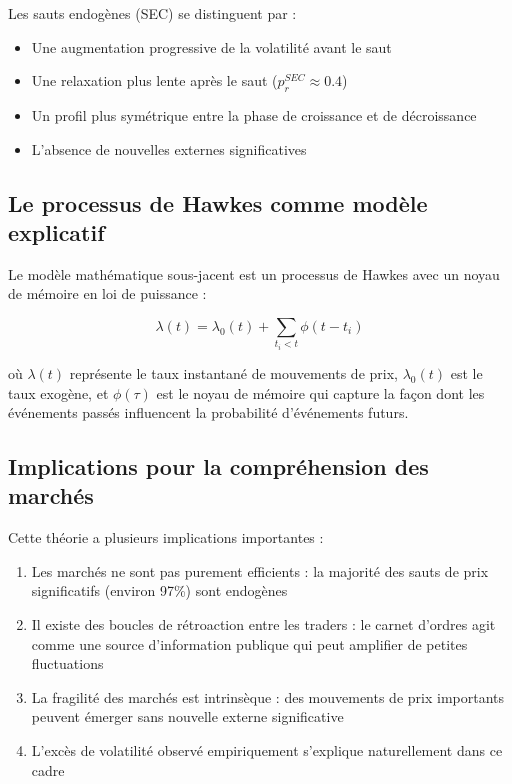 \documentclass[12pt,a4paper]{article}
\theoremstyle{definition}
\theoremstyle{remark}
\begin{document}
Les sauts endogènes (SEC) se distinguent par :
\begin{itemize}
    \item Une augmentation progressive de la volatilité avant le saut
    \item Une relaxation plus lente après le saut ($p_r^{SEC} \approx 0.4$)
    \item Un profil plus symétrique entre la phase de croissance et de décroissance
    \item L'absence de nouvelles externes significatives
\end{itemize}

\subsection{Le processus de Hawkes comme modèle explicatif}

Le modèle mathématique sous-jacent est un processus de Hawkes avec un noyau de mémoire en loi de puissance :

\begin{equation}
\lambda(t) = \lambda_0(t) + \sum_{t_i < t} \phi(t-t_i)
\end{equation}

où $\lambda(t)$ représente le taux instantané de mouvements de prix, $\lambda_0(t)$ est le taux exogène, et $\phi(\tau)$ est le noyau de mémoire qui capture la façon dont les événements passés influencent la probabilité d'événements futurs.

\subsection{Implications pour la compréhension des marchés}

Cette théorie a plusieurs implications importantes :

\begin{enumerate}
    \item Les marchés ne sont pas purement efficients : la majorité des sauts de prix significatifs (environ 97\%) sont endogènes
    \item Il existe des boucles de rétroaction entre les traders : le carnet d'ordres agit comme une source d'information publique qui peut amplifier de petites fluctuations
    \item La fragilité des marchés est intrinsèque : des mouvements de prix importants peuvent émerger sans nouvelle externe significative
    \item L'excès de volatilité observé empiriquement s'explique naturellement dans ce cadre
\end{enumerate}
\end{document}
